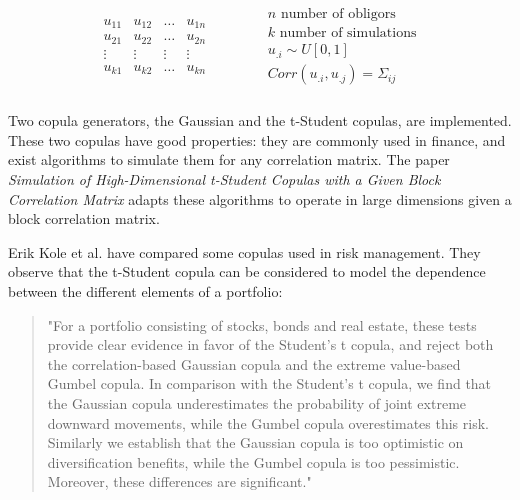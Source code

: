 \documentclass[a4paper,12pt,final]{article}
\begin{document}
\begin{displaymath}
\begin{array}{ccc}
\begin{array}{|c|c|c|c|}
u_{11} & u_{12} & \dots  & u_{1n} \\
u_{21} & u_{22} & \dots  & u_{2n} \\
\vdots & \vdots & \vdots & \vdots \\
u_{k1} & u_{k2} & \dots  & u_{kn} \\
\end{array}
&
\qquad
&
\begin{array}{c}
n \textrm{ number of obligors}    \\
k \textrm{ number of simulations}  \\
u_{.i} \sim U[0,1]                 \\
Corr(u_{.i}, u_{.j}) = \Sigma_{ij} \\
\end{array}
\end{array}
\end{displaymath}

Two copula generators, the Gaussian and the t-Student copulas, are implemented. 
These two copulas have good properties: they are commonly used in finance, and exist 
algorithms to simulate them for any correlation matrix.  The paper 
\emph{Simulation of High-Dimensional t-Student Copulas with a Given Block Correlation Matrix} 
\cite{ccruncher:astin} adapts these algorithms to operate in large dimensions given
a block correlation matrix.
\newline

Erik Kole et al. \cite{copu:selecting} have compared some copulas used in risk 
management. They observe that the t-Student copula can be considered to model the 
dependence between the different elements of a portfolio:
\begin{quotation}
"For a portfolio consisting of stocks, bonds and real estate, these tests provide
clear evidence in favor of the Student's t copula, and reject both the correlation-based
Gaussian copula and the extreme value-based Gumbel copula. In comparison with the
Student's t copula, we find that the Gaussian copula underestimates the probability of
joint extreme downward movements, while the Gumbel copula overestimates this risk.
Similarly we establish that the Gaussian copula is too optimistic on diversiﬁcation
benefits, while the Gumbel copula is too pessimistic. Moreover, these differences are
significant."
\end{quotation}
\end{document}
